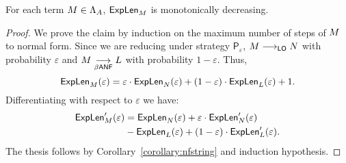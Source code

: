 \begin{proposition}
	For each term $M\in\Lambda_A$, $\textsf{ExpLen}_{M}$ is monotonically decreasing.
\end{proposition}
\begin{proof}
	We prove the claim by induction on the maximum number of steps of $M$ to normal form. Since we are reducing under strategy $\mathsf{P}_\varepsilon$, $M\longrightarrow_{\textsf{LO}}N$ with probability $\varepsilon$ and $M\underset{\beta\textsf{ANF}}{\longrightarrow}L$ with probability $1-\varepsilon$. Thus,
	$$
	\textsf{ExpLen}_{M}(\varepsilon) = \varepsilon\cdot\textsf{ExpLen}_{N}(\varepsilon) + (1-\varepsilon)\cdot \textsf{ExpLen}_{L}(\varepsilon) + 1.
	$$
	Differentiating with respect to $\varepsilon$ we have:
	\begin{align*}
		\textsf{ExpLen}_{M}'(\varepsilon) &= \textsf{ExpLen}_{N}(\varepsilon) + \varepsilon\cdot\textsf{ExpLen}_{N}'(\varepsilon)\\
		&-\textsf{ExpLen}_{L}(\varepsilon) + (1-\varepsilon)\cdot \textsf{ExpLen}_{L}'(\varepsilon).
	\end{align*}
	The thesis follows by Corollary~\ref{corollary:nfstring} and induction hypothesis.
\end{proof}